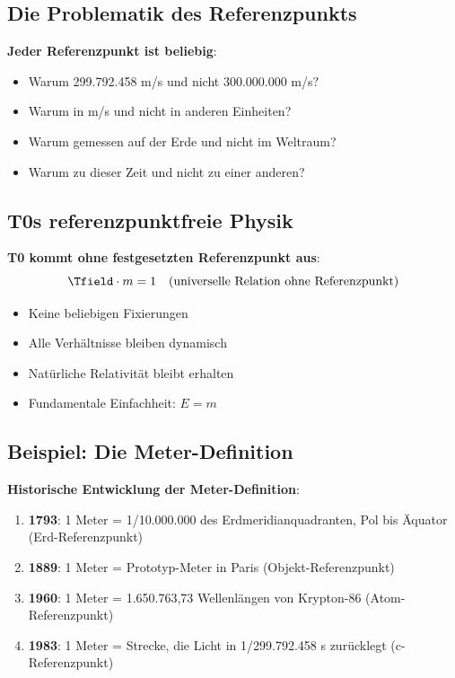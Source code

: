 	\subsection{Die Problematik des Referenzpunkts}
	
	\textbf{Jeder Referenzpunkt ist beliebig}:
	\begin{itemize}
		\item Warum 299.792.458 m/s und nicht 300.000.000 m/s?
		\item Warum in m/s und nicht in anderen Einheiten?
		\item Warum gemessen auf der Erde und nicht im Weltraum?
		\item Warum zu dieser Zeit und nicht zu einer anderen?
	\end{itemize}
	
	\subsection{T0s referenzpunktfreie Physik}
	
	\textbf{T0 kommt ohne festgesetzten Referenzpunkt aus}:
	\begin{equation}
		\Tfield \cdot m = 1 \quad \text{(universelle Relation ohne Referenzpunkt)}
	\end{equation}
	
	\begin{itemize}
		\item Keine beliebigen Fixierungen
		\item Alle Verhältnisse bleiben dynamisch
		\item Natürliche Relativität bleibt erhalten
		\item Fundamentale Einfachheit: $E = m$
	\end{itemize}
	
	\subsection{Beispiel: Die Meter-Definition}
	
	\textbf{Historische Entwicklung der Meter-Definition}:
	\begin{enumerate}
		\item \textbf{1793}: 1 Meter = 1/10.000.000 des Erdmeridianquadranten, Pol bis Äquator (Erd-Referenzpunkt)
		\item \textbf{1889}: 1 Meter = Prototyp-Meter in Paris (Objekt-Referenzpunkt)  
		\item \textbf{1960}: 1 Meter = 1.650.763,73 Wellenlängen von Krypton-86 (Atom-Referenzpunkt)
		\item \textbf{1983}: 1 Meter = Strecke, die Licht in 1/299.792.458 s zurücklegt (c-Referenzpunkt)
	\end{enumerate}
	
